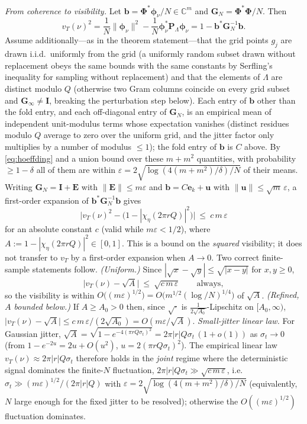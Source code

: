 \documentclass[10pt]{article}
\newcommand{\C}{\mathbb{C}}
\newcommand{\Lam}{\Lambda}
\newcommand{\Phimat}{\bm{\Phi}}
\newcommand{\norm}[1]{\lVert#1\rVert}
\newcommand{\vt}{v_T}
\begin{document}
\emph{From coherence to visibility.}  Let $\bm b=\Phimat^{*}\bm\phi_\nu/N\in\C^m$ and
$\bm G_N=\Phimat^{*}\Phimat/N$.  Then
\[
\vt(\nu)^2=\frac1N\norm{\bm\phi_\nu}^2-\frac1N\bm\phi_\nu^{*}\bm P_\Lam\bm\phi_\nu
=1-\bm b^{*}\bm G_N^{-1}\bm b .
\]
Assume additionally---as in the theorem statement---that the grid points $g_j$ are drawn
i.i.d.\ uniformly from the grid (a uniformly random subset drawn without replacement
obeys the same bounds with the same constants by Serfling's inequality for sampling
without replacement) and that the elements of $\Lam$ are distinct modulo $Q$ (otherwise
two Gram columns coincide on every grid subset and $\bm G_\infty\neq\bm I$, breaking the
perturbation step below).  Each entry of
$\bm b$ other than the fold entry, and each off-diagonal entry of $\bm G_N$, is an
empirical mean of independent unit-modulus terms whose expectation vanishes (distinct
residues modulo $Q$ average to zero over the uniform grid, and the jitter factor only
multiplies by a number of modulus $\le1$); the fold entry of $\bm b$ is $C$ above.  By
\eqref{eq:hoeffding} and a union bound over these $m+m^2$ quantities, with probability
$\ge1-\delta$ all of them are within
$\varepsilon=2\sqrt{\log(4(m+m^2)/\delta)/N}$ of their means.  Writing
$\bm G_N=\bm I+\bm E$ with $\norm{\bm E}\le m\varepsilon$ and
$\bm b=C\bm e_k+\bm u$ with $\norm{\bm u}\le\sqrt m\,\varepsilon$, a first-order
expansion of $\bm b^{*}\bm G_N^{-1}\bm b$ gives
\[
\big|\vt(\nu)^2-\big(1-|\chi_\eta(2\pi rQ)|^2\big)\big|
\ \le\ c\,m\,\varepsilon
\]
for an absolute constant $c$ (valid while $m\varepsilon<1/2$), where
$A:=1-|\chi_\eta(2\pi rQ)|^2\in[0,1]$.  This is a bound on the \emph{squared} visibility;
it does not transfer to $\vt$ by a first-order expansion when $A\to0$.  Two correct
finite-sample statements follow.  \emph{(Uniform.)}  Since $|\sqrt x-\sqrt y|\le\sqrt{|x-y|}$
for $x,y\ge0$,
\[
\big|\vt(\nu)-\sqrt A\big|\ \le\ \sqrt{c\,m\,\varepsilon}\qquad\text{always},
\]
so the visibility is within $O\!\big((m\varepsilon)^{1/2}\big)=O\!\big(m^{1/2}(\log/N)^{1/4}\big)$
of $\sqrt A$.  \emph{(Refined, $A$ bounded below.)}  If $A\ge A_0>0$ then, since $\sqrt\cdot$
is $\tfrac1{2\sqrt{A_0}}$-Lipschitz on $[A_0,\infty)$,
$\big|\vt(\nu)-\sqrt A\big|\le c\,m\,\varepsilon/(2\sqrt{A_0})=O(m\varepsilon/\sqrt A)$.
\emph{Small-jitter linear law.}  For Gaussian jitter,
$\sqrt A=\sqrt{1-e^{-4(\pi rQ\sigma_t)^2}}=2\pi|r|Q\sigma_t\,(1+o(1))$ as $\sigma_t\to0$
(from $1-e^{-2u}=2u+O(u^2)$, $u=2(\pi rQ\sigma_t)^2$).  The empirical linear law
$\vt(\nu)\approx2\pi|r|Q\sigma_t$ therefore holds in the \emph{joint} regime where the
deterministic signal dominates the finite-$N$ fluctuation,
$2\pi|r|Q\sigma_t\gg\sqrt{c\,m\,\varepsilon}$, i.e.\
$\sigma_t\gg(m\varepsilon)^{1/2}/(2\pi|r|Q)$ with $\varepsilon=2\sqrt{\log(4(m+m^2)/\delta)/N}$
(equivalently, $N$ large enough for the fixed jitter to be resolved); otherwise the
$O((m\varepsilon)^{1/2})$ fluctuation dominates.
\end{document}
